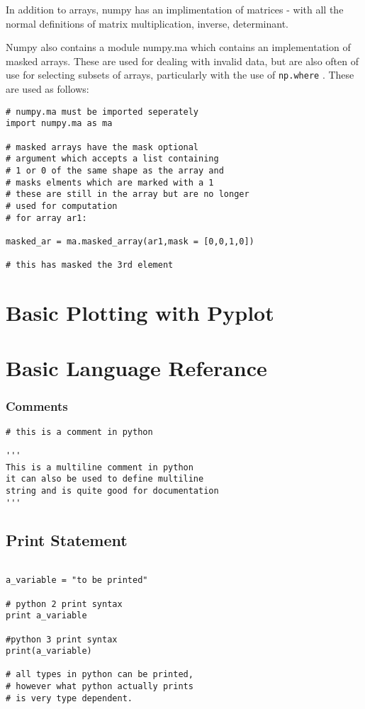 \documentclass[11pt,a4paper]{article}
\begin{document}
In addition to arrays, numpy has an implimentation of matrices - with all the normal definitions of matrix multiplication, inverse, determinant.

Numpy also contains a module numpy.ma which contains an implementation of masked arrays. These are used for dealing with invalid data, but are also often of use for selecting subsets of arrays, particularly with the use of \verb|np.where| . These are used as follows:

\begin{verbatim}
# numpy.ma must be imported seperately
import numpy.ma as ma

# masked arrays have the mask optional
# argument which accepts a list containing
# 1 or 0 of the same shape as the array and
# masks elments which are marked with a 1
# these are still in the array but are no longer
# used for computation 
# for array ar1:

masked_ar = ma.masked_array(ar1,mask = [0,0,1,0])

# this has masked the 3rd element

\end{verbatim}

\section{Basic Plotting with Pyplot}

\appendix

\section{Basic Language Referance}

\subsubsection{Comments}
\begin{verbatim}
# this is a comment in python

'''
This is a multiline comment in python
it can also be used to define multiline
string and is quite good for documentation
'''

\end{verbatim}

\subsection{Print Statement}
\begin{verbatim}

a_variable = "to be printed"

# python 2 print syntax
print a_variable

#python 3 print syntax
print(a_variable)

# all types in python can be printed,
# however what python actually prints
# is very type dependent.

\end{verbatim}
\end{document}
